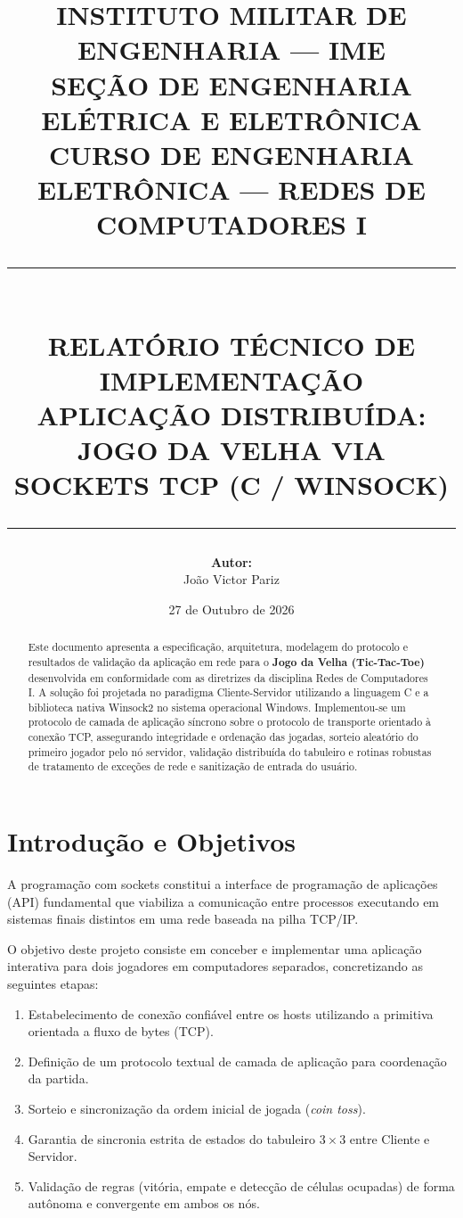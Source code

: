 \documentclass[a4paper,12pt]{article}
\title{
    \vspace{-1.5cm}
    \textbf{\Large INSTITUTO MILITAR DE ENGENHARIA --- IME}\\[0.2cm]
    \textbf{\large SEÇÃO DE ENGENHARIA ELÉTRICA E ELETRÔNICA}\\[0.1cm]
    \textbf{\normalsize CURSO DE ENGENHARIA ELETRÔNICA --- REDES DE COMPUTADORES I}\\[0.8cm]
    \rule{\linewidth}{1.2pt}\\[0.4cm]
    \textbf{\LARGE RELATÓRIO TÉCNICO DE IMPLEMENTAÇÃO}\\[0.2cm]
    \textbf{\Large APLICAÇÃO DISTRIBUÍDA: JOGO DA VELHA VIA SOCKETS TCP (C / WINSOCK)}\\[0.3cm]
    \rule{\linewidth}{1.2pt}
}
\author{
    \textbf{Autor:}\\[0.2cm]
    João Victor Pariz
}
\date{27 de Outubro de 2026}
\begin{document}
\maketitle

\begin{abstract}
Este documento apresenta a especificação, arquitetura, modelagem do protocolo e resultados de validação da aplicação em rede para o \textbf{Jogo da Velha (Tic-Tac-Toe)} desenvolvida em conformidade com as diretrizes da disciplina Redes de Computadores I. A solução foi projetada no paradigma Cliente-Servidor utilizando a linguagem C e a biblioteca nativa Winsock2 no sistema operacional Windows. Implementou-se um protocolo de camada de aplicação síncrono sobre o protocolo de transporte orientado à conexão TCP, assegurando integridade e ordenação das jogadas, sorteio aleatório do primeiro jogador pelo nó servidor, validação distribuída do tabuleiro e rotinas robustas de tratamento de exceções de rede e sanitização de entrada do usuário.
\end{abstract}

\vspace{0.3cm}

\section{Introdução e Objetivos}

A programação com sockets constitui a interface de programação de aplicações (API) fundamental que viabiliza a comunicação entre processos executando em sistemas finais distintos em uma rede baseada na pilha TCP/IP.

O objetivo deste projeto consiste em conceber e implementar uma aplicação interativa para dois jogadores em computadores separados, concretizando as seguintes etapas:
\begin{enumerate}
    \item Estabelecimento de conexão confiável entre os hosts utilizando a primitiva orientada a fluxo de bytes (TCP).
    \item Definição de um protocolo textual de camada de aplicação para coordenação da partida.
    \item Sorteio e sincronização da ordem inicial de jogada (\textit{coin toss}).
    \item Garantia de sincronia estrita de estados do tabuleiro $3 \times 3$ entre Cliente e Servidor.
    \item Validação de regras (vitória, empate e detecção de células ocupadas) de forma autônoma e convergente em ambos os nós.
\end{enumerate}
\end{document}
